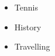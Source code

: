 %
%
%

\twocolumnsection
{
\begin{skills}
\end{skills}}
{
\vspace{1em}
\begin{itemize}
	\item Tennis
	\item History                    
    \item Travelling
\end{itemize}
}
